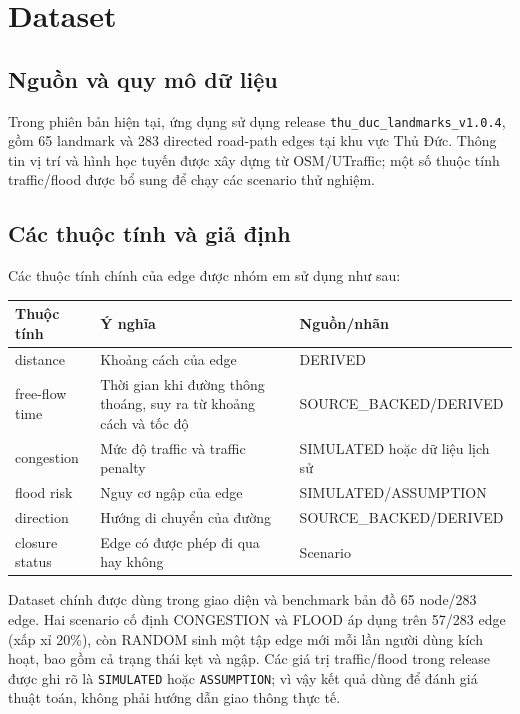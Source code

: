 \section{Dataset}
\subsection{Nguồn và quy mô dữ liệu}
Trong phiên bản hiện tại, ứng dụng sử dụng release \texttt{thu\_duc\_landmarks\_v1.0.4}, gồm 65 landmark và 283 directed road-path edges tại khu vực Thủ Đức. Thông tin vị trí và hình học tuyến được xây dựng từ OSM/UTraffic; một số thuộc tính traffic/flood được bổ sung để chạy các scenario thử nghiệm.

\subsection{Các thuộc tính và giả định}
Các thuộc tính chính của edge được nhóm em sử dụng như sau:
\begin{center}
{\small
\begin{tabular}{l l l}
\toprule
Thuộc tính & Ý nghĩa & Nguồn/nhãn\\
\midrule
distance & Khoảng cách của edge & DERIVED\\
free-flow time & Thời gian khi đường thông thoáng, suy ra từ khoảng cách và tốc độ & SOURCE\_BACKED/DERIVED\\
congestion & Mức độ traffic và traffic penalty & SIMULATED hoặc dữ liệu lịch sử\\
flood risk & Nguy cơ ngập của edge & SIMULATED/ASSUMPTION\\
direction & Hướng di chuyển của đường & SOURCE\_BACKED/DERIVED\\
closure status & Edge có được phép đi qua hay không & Scenario\\
\bottomrule
\end{tabular}
}
\end{center}

Dataset chính được dùng trong giao diện và benchmark bản đồ 65 node/283 edge. Hai scenario cố định CONGESTION và FLOOD áp dụng trên 57/283 edge (xấp xỉ 20\%), còn RANDOM sinh một tập edge mới mỗi lần người dùng kích hoạt, bao gồm cả trạng thái kẹt và ngập. Các giá trị traffic/flood trong release được ghi rõ là \texttt{SIMULATED} hoặc \texttt{ASSUMPTION}; vì vậy kết quả dùng để đánh giá thuật toán, không phải hướng dẫn giao thông thực tế.
